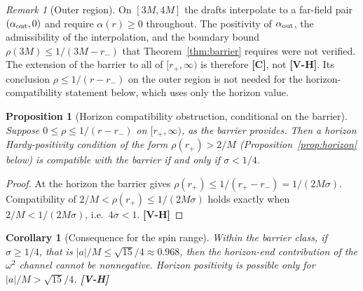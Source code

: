 \documentclass[11pt, a4paper]{article}
\newcommand{\VH}{\textcolor{vh}{\textbf{[V-H]}}}
\newcommand{\CC}{\textcolor{cc}{\textbf{[C]}}}
\newtheorem{proposition}[theorem]{Proposition}
\newtheorem{corollary}[theorem]{Corollary}
\theoremstyle{remark}
\newtheorem{remark}[theorem]{Remark}
\theoremstyle{definition}
\begin{document}
\begin{remark}[Outer region]
On $[3M, 4M]$ the drafts interpolate to a far-field pair $(\alpha_{\rm out}, 0)$ and require $\alpha(r)\ge 0$ throughout. The positivity of $\alpha_{\rm out}$, the admissibility of the interpolation, and the boundary bound $\rho(3M) \le 1/(3M-r_-)$ that Theorem~\ref{thm:barrier} requires were not verified. The extension of the barrier to all of $[r_+,\infty)$ is therefore \CC, not \VH. Its conclusion $\rho \le 1/(r-r_-)$ on the outer region is not needed for the horizon-compatibility statement below, which uses only the horizon value.
\end{remark}

\begin{proposition}[Horizon compatibility obstruction, conditional on the barrier]
\label{prop:compat}
Suppose $0 \le \rho \le 1/(r-r_-)$ on $[r_+,\infty)$, as the barrier provides. Then a horizon Hardy-positivity condition of the form $\rho(r_+) > 2/M$ (Proposition~\ref{prop:horizon} below) is compatible with the barrier if and only if $\sigma < 1/4$.
\end{proposition}

\begin{proof}
At the horizon the barrier gives $\rho(r_+) \le 1/(r_+-r_-) = 1/(2M\sigma)$. Compatibility of $2/M < \rho(r_+) \le 1/(2M\sigma)$ holds exactly when $2/M < 1/(2M\sigma)$, i.e.\ $4\sigma < 1$. \VH
\end{proof}

\begin{corollary}[Consequence for the spin range]
Within the barrier class, if $\sigma \ge 1/4$, that is $|a|/M \le \sqrt{15}/4 \approx 0.968$, then the horizon-end contribution of the $\omega^2$ channel cannot be nonnegative. Horizon positivity is possible only for $|a|/M > \sqrt{15}/4$. \VH
\end{corollary}
\end{document}

